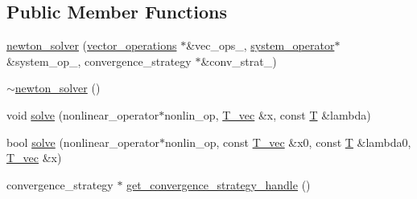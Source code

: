 \subsection*{Public Member Functions}
\begin{DoxyCompactItemize}
\item 
\hyperlink{classnumerical__algos_1_1newton__method_1_1newton__solver_a13fe3a3fd96e29a74aeefc03206721bb}{newton\-\_\-solver} (\hyperlink{container__test_8cpp_aca3cc0310428d338f3a165c7823d6499}{vector\-\_\-operations} $\ast$\&vec\-\_\-ops\-\_\-, \hyperlink{structsystem__operator}{system\-\_\-operator}$\ast$\&system\-\_\-op\-\_\-, convergence\-\_\-strategy $\ast$\&conv\-\_\-strat\-\_\-)
\item 
\hyperlink{classnumerical__algos_1_1newton__method_1_1newton__solver_a854120e992f61dab4194072844a1ddbd}{$\sim$newton\-\_\-solver} ()
\item 
void \hyperlink{classnumerical__algos_1_1newton__method_1_1newton__solver_ac7b04b8ab16d9ee3e001c8c6c81cf55c}{solve} (nonlinear\-\_\-operator$\ast$nonlin\-\_\-op, \hyperlink{classnumerical__algos_1_1newton__method_1_1newton__solver_afc800f3277daaae0e778d366f857b43f}{T\-\_\-vec} \&x, const \hyperlink{classnumerical__algos_1_1newton__method_1_1newton__solver_ad3e4bf5e0eec7f6f103f27378d8b9be7}{T} \&lambda)
\item 
bool \hyperlink{classnumerical__algos_1_1newton__method_1_1newton__solver_a824a046e3d48548a799b140c5c97b015}{solve} (nonlinear\-\_\-operator$\ast$nonlin\-\_\-op, const \hyperlink{classnumerical__algos_1_1newton__method_1_1newton__solver_afc800f3277daaae0e778d366f857b43f}{T\-\_\-vec} \&x0, const \hyperlink{classnumerical__algos_1_1newton__method_1_1newton__solver_ad3e4bf5e0eec7f6f103f27378d8b9be7}{T} \&lambda0, \hyperlink{classnumerical__algos_1_1newton__method_1_1newton__solver_afc800f3277daaae0e778d366f857b43f}{T\-\_\-vec} \&x)
\item 
convergence\-\_\-strategy $\ast$ \hyperlink{classnumerical__algos_1_1newton__method_1_1newton__solver_ab176c625a844de933317df8f4cb5d0db}{get\-\_\-convergence\-\_\-strategy\-\_\-handle} ()
\end{DoxyCompactItemize}


